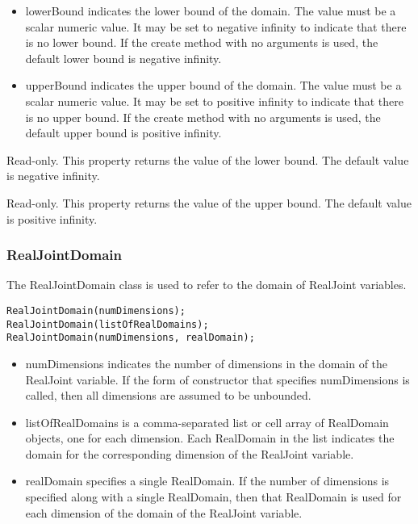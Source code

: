 \begin{itemize}
\item lowerBound indicates the lower bound of the domain.  The value must be a scalar numeric value.  It may be set to negative infinity to indicate that there is no lower bound.  If the create method with no arguments is used, the default lower bound is negative infinity.
\item upperBound indicates the upper bound of the domain.  The value must be a scalar numeric value.  It may be set to positive infinity to indicate that there is no upper bound.  If the create method with no arguments is used, the default upper bound is positive infinity.
\end{itemize}

\fi


\ifmatlab
{}
\fi
\ifjava
{}
\fi

Read-only.  This property returns the value of the lower bound.  The default value is negative infinity.

\ifmatlab
{}
\fi
\ifjava
{}
\fi

Read-only.  This property returns the value of the upper bound.  The default value is positive infinity.



\subsubsection{RealJointDomain}
\label{sec:RealJointDomain}

The RealJointDomain class is used to refer to the domain of RealJoint variables.


\ifmatlab
\begin{lstlisting}
RealJointDomain(numDimensions);
RealJointDomain(listOfRealDomains);
RealJointDomain(numDimensions, realDomain);
\end{lstlisting}

\begin{itemize}
\item numDimensions indicates the number of dimensions in the domain of the RealJoint variable.  If the form of constructor that specifies numDimensions is called, then all dimensions are assumed to be unbounded.
\item listOfRealDomains is a comma-separated list or cell array of RealDomain objects, one for each dimension.  Each RealDomain in the list indicates the domain for the corresponding dimension of the RealJoint variable.
\item realDomain specifies a single RealDomain.  If the number of dimensions is specified along with a single RealDomain, then that RealDomain is used for each dimension of the domain of the RealJoint variable.
\end{itemize}
\fi

